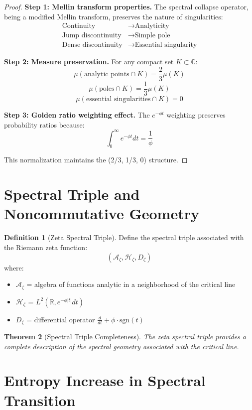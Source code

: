 \documentclass[12pt]{article}
\theoremstyle{plain}
\newtheorem{theorem}{Theorem}[section]
\theoremstyle{definition}
\newtheorem{definition}[theorem]{Definition}
\begin{document}
\begin{proof}
\textbf{Step 1: Mellin transform properties.}
The spectral collapse operator, being a modified Mellin transform, preserves the nature of singularities:
\begin{align}
\text{Continuity} &\to \text{Analyticity}\\
\text{Jump discontinuity} &\to \text{Simple pole}\\
\text{Dense discontinuity} &\to \text{Essential singularity}
\end{align}

\textbf{Step 2: Measure preservation.}
For any compact set $K \subset \mathbb{C}$:
$$\mu(\text{analytic points} \cap K) = \frac{2}{3}\mu(K)$$
$$\mu(\text{poles} \cap K) = \frac{1}{3}\mu(K)$$
$$\mu(\text{essential singularities} \cap K) = 0$$

\textbf{Step 3: Golden ratio weighting effect.}
The $e^{-\phi t}$ weighting preserves probability ratios because:
$$\int_0^{\infty} e^{-\phi t} dt = \frac{1}{\phi}$$

This normalization maintains the (2/3, 1/3, 0) structure.
\end{proof}

\section{Spectral Triple and Noncommutative Geometry}

\begin{definition}[Zeta Spectral Triple]
Define the spectral triple associated with the Riemann zeta function:
$$(\mathcal{A}_\zeta, \mathcal{H}_\zeta, D_\zeta)$$
where:
\begin{itemize}
\item $\mathcal{A}_\zeta$ = algebra of functions analytic in a neighborhood of the critical line
\item $\mathcal{H}_\zeta$ = $L^2(\mathbb{R}, e^{-\phi|t|} dt)$
\item $D_\zeta$ = differential operator $\frac{d}{dt} + \phi \cdot \text{sgn}(t)$
\end{itemize}
\end{definition}

\begin{theorem}[Spectral Triple Completeness]
The zeta spectral triple provides a complete description of the spectral geometry associated with the critical line.
\end{theorem}

\section{Entropy Increase in Spectral Transition}
\end{document}
